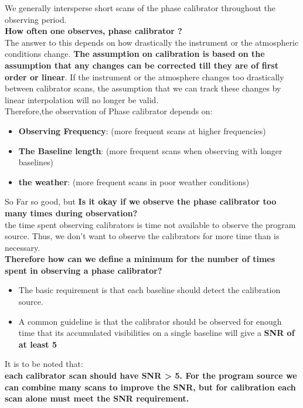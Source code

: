\documentclass[10pt]{report}
\newcommand{\tbf}[1]{\textbf{#1}}
\begin{document}
 We generally intersperse short scans of the phase calibrator throughout the observing period. \\
 
 \tbf{How often one observes, phase calibrator ?}\\
 The answer to this depends on how drastically the instrument or the atmospheric conditions change. \tbf{The assumption on calibration is based on the assumption that any changes can be corrected till they are of first order or linear}. If  the instrument or the atmosphere changes too drastically between calibrator scans, the assumption that we can track these changes by linear interpolation will no longer be valid. \\
 
 Therefore,the observation of Phase calibrator depends on: 
 \begin{itemize}
 \item  \tbf{Observing Frequency}:  (more frequent scans at higher frequencies)
 \item \tbf{The Baseline length}:  (more frequent scans when observing with longer baselines) 
 \item \tbf{the weather}: (more frequent scans in poor weather conditions)
\end{itemize}  

So Far so good, but
\tbf{Is it okay if we observe the phase calibrator too many times during observation?}\\
 the time spent observing calibrators is time not available to observe the program source.  Thus, we don't want to observe the calibrators for more time than is necessary.\\
 
\tbf{Therefore how can we define a minimum for the number of times spent in observing a phase calibrator?} 
\begin{itemize}
\item    The basic requirement is that each baseline should detect the calibration source.
\item A common guideline is that the calibrator should be observed for enough time that its accumulated visibilities on a single baseline will give a \tbf{SNR of at least 5}
\end{itemize}   

It is to be noted that:\\
\tbf{each calibrator scan should have SNR  > 5.  For the program source we can combine many scans to improve the SNR, but for calibration each scan alone must meet the SNR requirement. }\\
\end{document}
